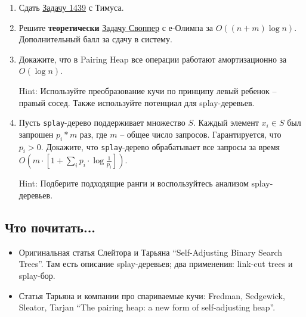 \begin{enumerate}

  \item Сдать \href{http://acm.timus.ru/problem.aspx?space=1&num=1439}
{Задачу 1439} с Тимуса.

  \item Решите \textbf{теоретически}  \href{http://www.e-olimp.com/problems/689}
{Задачу Своппер} с е-Олимпа за $O((n + m) \log n)$. Дополнительный балл за сдачу
в систему.

  \item Докажите, что в Pairing Heap все операции работают амортизационно за 
$O(\log n)$.

Hint: Используйте преобразование кучи по принципу левый ребенок -- правый сосед. Также
используйте потенциал для splay-деревьев.

  \item Пусть \texttt{splay}-дерево поддерживает множество $S$. Каждый элемент 
$x_i \in S$ был запрошен $p_i * m$ раз, где $m$ -- общее число запросов. 
Гарантируется, что $p_i > 0$. Докажите, что \texttt{splay}-дерево обрабатывает
все запросы за время $O(m \cdot \left[ 1 + \sum_{i} p_i \cdot \log \frac{1}{p_i} 
\right])$.

Hint: Подберите подходящие ранги и воспользуйтесь анализом splay-деревьев.

\end{enumerate}

\subsection{Что почитать...}

\begin{itemize}
  
  \item Оригинальная статья Слейтора и Тарьяна ``Self-Adjusting Binary Search Trees''.
  Там есть описание splay-деревьев; 
  два применения: link-cut trees и splay-бор.
  
  \item Статья Тарьяна и компании про спариваемые кучи: Fredman, Sedgewick, 
  Sleator, Tarjan ``The pairing heap: a new form of self-adjusting heap''.

\end{itemize}

\clearpage
